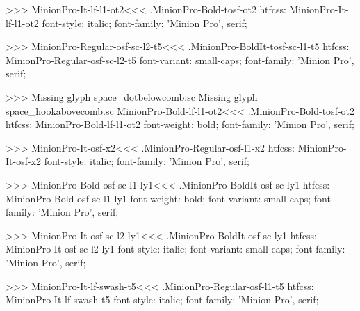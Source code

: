 {>>>
\<MinionPro-It-lf-l1-ot2\><<<
.MinionPro-Bold-tosf-ot2
htfcss:  MinionPro-It-lf-l1-ot2  font-style: italic; font-family: 'Minion Pro', serif;

>>>
\<MinionPro-Regular-osf-sc-l2-t5\><<<
.MinionPro-BoldIt-tosf-sc-l1-t5
htfcss:  MinionPro-Regular-osf-sc-l2-t5  font-variant: small-caps; font-family: 'Minion Pro', serif;

>>>
Missing glyph	space_dotbelowcomb.sc
Missing glyph	space_hookabovecomb.sc
\<MinionPro-Bold-lf-l1-ot2\><<<
.MinionPro-Bold-tosf-ot2
htfcss:  MinionPro-Bold-lf-l1-ot2  font-weight: bold; font-family: 'Minion Pro', serif;

>>>
\<MinionPro-It-osf-x2\><<<
.MinionPro-Regular-osf-l1-x2
htfcss:  MinionPro-It-osf-x2  font-style: italic; font-family: 'Minion Pro', serif;

>>>
\<MinionPro-Bold-osf-sc-l1-ly1\><<<
.MinionPro-BoldIt-osf-sc-ly1
htfcss:  MinionPro-Bold-osf-sc-l1-ly1  font-weight: bold; font-variant: small-caps; font-family: 'Minion Pro', serif;

>>>
\<MinionPro-It-osf-sc-l2-ly1\><<<
.MinionPro-BoldIt-osf-sc-ly1
htfcss:  MinionPro-It-osf-sc-l2-ly1  font-style: italic; font-variant: small-caps; font-family: 'Minion Pro', serif;

>>>
\<MinionPro-It-lf-swash-t5\><<<
.MinionPro-Regular-osf-l1-t5
htfcss:  MinionPro-It-lf-swash-t5  font-style: italic; font-family: 'Minion Pro', serif;

}
